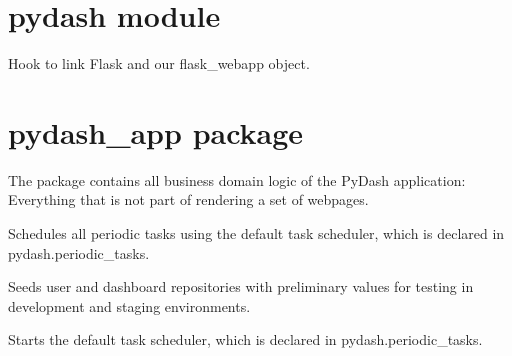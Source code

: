 \documentclass[letterpaper,10pt,english]{sphinxmanual}
\begin{document}
\section{pydash module}
\label{\detokenize{pydash:module-pydash}}\label{\detokenize{pydash:pydash-module}}\label{\detokenize{pydash::doc}}
Hook to link Flask and our flask\_webapp object.


\section{pydash\_app package}
\label{\detokenize{pydash_app:module-pydash_app}}\label{\detokenize{pydash_app:pydash-app-package}}\label{\detokenize{pydash_app::doc}}
The  package contains all business domain logic of the PyDash application: Everything that is not part of rendering a set of webpages.

\begin{fulllineitems}
\label{\detokenize{pydash_app:pydash_app.schedule_periodic_tasks}}
Schedules all periodic tasks using the default task scheduler, which is declared in pydash.periodic\_tasks.

\end{fulllineitems}


\begin{fulllineitems}
\label{\detokenize{pydash_app:pydash_app.seed_datastructures}}
Seeds user and dashboard repositories with preliminary values for testing in development and staging environments.

\end{fulllineitems}


\begin{fulllineitems}
\label{\detokenize{pydash_app:pydash_app.start_task_scheduler}}
Starts the default task scheduler, which is declared in pydash.periodic\_tasks.

\end{fulllineitems}
\end{document}
